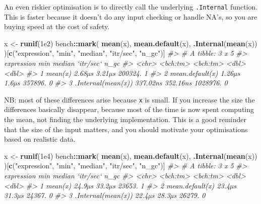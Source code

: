 \documentclass[]{book}
\newenvironment{Shaded}{\begin{snugshade}}{\end{snugshade}}
\newcommand{\CommentTok}[1]{\textcolor[rgb]{0.37,0.37,0.37}{\textit{#1}}}
\newcommand{\FloatTok}[1]{\textcolor[rgb]{0.06,0.06,0.06}{#1}}
\newcommand{\KeywordTok}[1]{\textcolor[rgb]{0.27,0.27,0.27}{\textbf{#1}}}
\newcommand{\NormalTok}[1]{#1}
\newcommand{\OperatorTok}[1]{\textcolor[rgb]{0.43,0.43,0.43}{\textbf{#1}}}
\newcommand{\StringTok}[1]{\textcolor[rgb]{0.5,0.5,0.5}{#1}}
\begin{document}
An even riskier optimisation is to directly call the underlying \texttt{.Internal} function. This is faster because it doesn't do any input checking or handle NA's, so you are buying speed at the cost of safety.

\begin{Shaded}
\begin{Highlighting}[]
\NormalTok{x <-}\StringTok{ }\KeywordTok{runif}\NormalTok{(}\FloatTok{1e2}\NormalTok{)}
\NormalTok{bench}\OperatorTok{::}\KeywordTok{mark}\NormalTok{(}
  \KeywordTok{mean}\NormalTok{(x),}
  \KeywordTok{mean.default}\NormalTok{(x),}
  \KeywordTok{.Internal}\NormalTok{(}\KeywordTok{mean}\NormalTok{(x))}
\NormalTok{)[}\KeywordTok{c}\NormalTok{(}\StringTok{"expression"}\NormalTok{, }\StringTok{"min"}\NormalTok{, }\StringTok{"median"}\NormalTok{, }\StringTok{"itr/sec"}\NormalTok{, }\StringTok{"n_gc"}\NormalTok{)]}
\CommentTok{#> # A tibble: 3 x 5}
\CommentTok{#>   expression              min   median `itr/sec`  n_gc}
\CommentTok{#>   <chr>              <bch:tm> <bch:tm>     <dbl> <dbl>}
\CommentTok{#> 1 mean(x)              2.68µs   3.21µs   200324.     1}
\CommentTok{#> 2 mean.default(x)      1.26µs    1.6µs   357896.     0}
\CommentTok{#> 3 .Internal(mean(x)) 337.02ns 352.16ns  1028976.     0}
\end{Highlighting}
\end{Shaded}

NB: most of these differences arise because \texttt{x} is small. If you increase the size the differences basically disappear, because most of the time is now spent computing the mean, not finding the underlying implementation. This is a good reminder that the size of the input matters, and you should motivate your optimisations based on realistic data.

\begin{Shaded}
\begin{Highlighting}[]
\NormalTok{x <-}\StringTok{ }\KeywordTok{runif}\NormalTok{(}\FloatTok{1e4}\NormalTok{)}
\NormalTok{bench}\OperatorTok{::}\KeywordTok{mark}\NormalTok{(}
  \KeywordTok{mean}\NormalTok{(x),}
  \KeywordTok{mean.default}\NormalTok{(x),}
  \KeywordTok{.Internal}\NormalTok{(}\KeywordTok{mean}\NormalTok{(x))}
\NormalTok{)[}\KeywordTok{c}\NormalTok{(}\StringTok{"expression"}\NormalTok{, }\StringTok{"min"}\NormalTok{, }\StringTok{"median"}\NormalTok{, }\StringTok{"itr/sec"}\NormalTok{, }\StringTok{"n_gc"}\NormalTok{)]}
\CommentTok{#> # A tibble: 3 x 5}
\CommentTok{#>   expression              min   median `itr/sec`  n_gc}
\CommentTok{#>   <chr>              <bch:tm> <bch:tm>     <dbl> <dbl>}
\CommentTok{#> 1 mean(x)              24.9µs   33.2µs    23653.     1}
\CommentTok{#> 2 mean.default(x)      23.4µs   31.3µs    24367.     0}
\CommentTok{#> 3 .Internal(mean(x))   22.4µs   28.3µs    26279.     0}
\end{Highlighting}
\end{Shaded}
\end{document}
